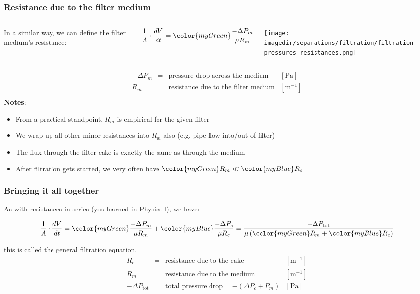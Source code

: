 \begin{frame}\frametitle{Resistance due to the filter medium}
	\begin{columns}[t]
			In a similar way, we can define the filter {\color{myGreen}medium}'s resistance:
			\begin{exampleblock}{}
				\[\dfrac{1}{A} \cdot \dfrac{dV}{dt} = {\color{myGreen}\dfrac{-\Delta P_m}{\mu R_m}} \]
			\end{exampleblock}
			\vspace{-24pt}
			\begin{center}
				\texttt{[image: \\imagedir/separations/filtration/filtration-pressures-resistances.png]}
			\end{center}
	\end{columns}
	\[
		\begin{array}{rcll}
			-\Delta P_m		&=& \text{pressure drop across the medium}			&[\text{Pa}]\\
			R_m  			&=& \text{resistance due to the filter medium}		&[\text{m}^{-1}]\\
		\end{array}
	\]
	\textbf{Notes}:
	\begin{itemize}
		\item	From a practical standpoint, $R_m$ is empirical for the given filter
		\item	We wrap up all other minor resistances into $R_m$ also (e.g. pipe flow into/out of filter)
		\item	The flux through the {\color{myBlue}filter cake} is exactly the same as through the {\color{myGreen} medium} 
		\item	After filtration gets started, we very often have ${\color{myGreen}R_m} \ll {\color{myBlue}R_c}$
	\end{itemize}
\end{frame}

\begin{frame}\frametitle{Bringing it all together}
	As with resistances in series (you learned in Physics I), we have:
	\begin{exampleblock}{}
		\[\dfrac{1}{A} \cdot \dfrac{dV}{dt} = {\color{myGreen}\dfrac{-\Delta P_m}{\mu R_m}} + {\color{myBlue}\dfrac{-\Delta P_c}{\mu R_c}} = \dfrac{-\Delta P_\text{tot}}{\mu \left({\color{myGreen}R_m} + {\color{myBlue}R_c} \right)}\]
	\end{exampleblock}
	this is called the {\color{purple} general filtration equation}.
	\[
		\begin{array}{rcll}
			R_c  &=& \text{resistance due to the cake}				&[\text{m}^{-1}]\\
			R_m  &=& \text{resistance due to the medium}			&[\text{m}^{-1}]\\
			-\Delta P_\text{tot}	&=& \text{total pressure drop} = -(\Delta P_c + P_m)	&[\text{Pa}]
		\end{array}
	\]
\end{frame}

